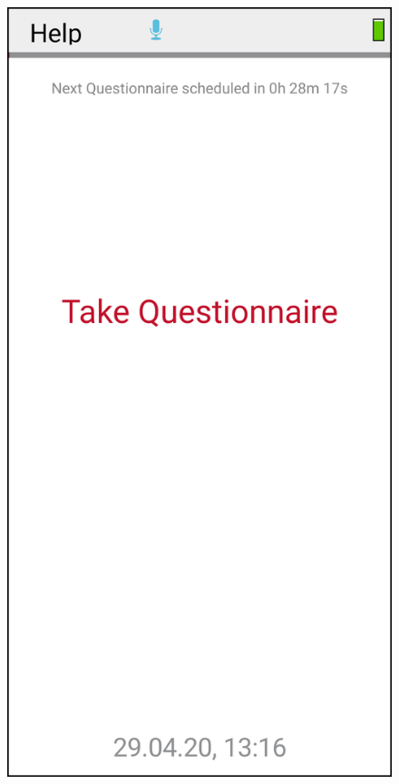 \documentclass[11pt,a4paper,titlepage]{article}
\begin{document}
\begin{figure}
\vspace{-0.5cm}
		\centering
			\begin{minipage}{0.30\textwidth}
			\includegraphics[width=1.00\textwidth]{images/screen_menu_box.png}
			\label{fig:menu}
			\end{minipage}
	\end{figure}
\end{document}
